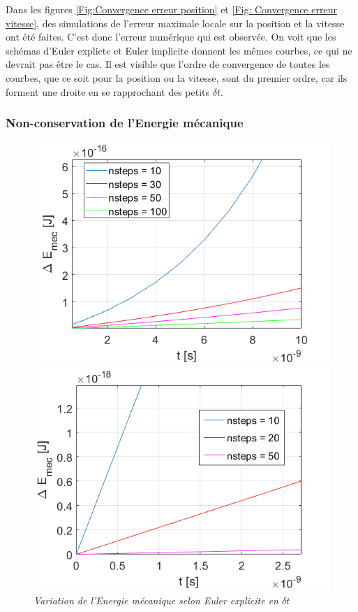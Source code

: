 \documentclass[a4paper,12pt,twoside]{article}
\begin{document}
		Dans les figures \ref{Fig:Convergence erreur position} et \ref{Fig: Convergence erreur vitesse}, des simulations de l'erreur maximale locale sur la position et la vitesse ont \'et\'e faites. C'est donc l'erreur num\'erique qui est observ\'ee.
		On voit que les sch\'emas d'Euler explicte et Euler implicite donnent les m\^emes courbes, ce qui ne devrait pas être le cas.
		Il est visible que l'ordre de convergence de toutes les courbes, que ce soit pour la position ou la vitesse, sont du premier ordre, car ils forment une droite en se rapprochant des petits $\delta t$.

		\subsubsection{Non-conservation de l'Energie m\'ecanique }
	\begin{figure}[h]
		\begin{minipage}[c]{.46\linewidth}
			\centering
			\includegraphics[scale = 0.6]{D_E_mec_E.png}
			\caption{\em\label{Fig:Emec E} Variation de l'Energie m\'ecanique selon Euler explicite en $\delta t$}
		\end{minipage}
		\hfill%
		\begin{minipage}[c]{.46\linewidth}
			\centering
			\includegraphics[scale = 0.6]{D_E_mec_RK2.png}

\end{minipage}
\end{figure}
\end{document}
